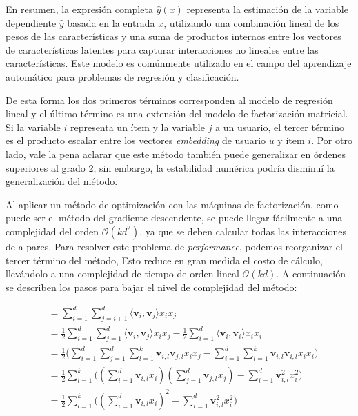 \documentclass[11pt,a4paper,twoside]{thesis}
\begin{document}
En resumen, la expresión completa $\hat{y}(x)$ representa la estimación de la
variable dependiente $\hat{y}$ basada en la entrada $x$, utilizando una
combinación lineal de los pesos de las características y una suma de productos
internos entre los vectores de características latentes para capturar
interacciones no lineales entre las características. Este modelo es comúnmente
utilizado en el campo del aprendizaje automático para problemas de regresión y
clasificación.

De esta forma los dos primeros términos corresponden al modelo de regresión
lineal y el último término es una extensión del modelo de factorización
matricial. Si la variable $i$ representa un ítem y la variable $j$ a un
usuario, el tercer término es el producto escalar entre los vectores
\textit{embedding} de usuario $u$ y ítem $i$. Por otro lado, vale la pena
aclarar que este método también puede generalizar en órdenes superiores al
grado 2, sin embargo, la estabilidad numérica podría disminuí la generalización
del método.

Al aplicar un método de optimización con las máquinas de factorización, como
puede ser el método del gradiente descendente, se puede llegar fácilmente a una
complejidad del orden $\mathcal{O}(kd^2)$, ya que se deben calcular todas las
interacciones de a pares. Para resolver este problema de \textit{performance},
podemos reorganizar el tercer término del método, Esto reduce en gran medida el
costo de cálculo, llevándolo a una complejidad de tiempo de orden lineal
$\mathcal{O}(kd)$. A continuación se describen los pasos para bajar el nivel de
complejidad del método:

\begin{equation}
	\begin{split}
		 & =\sum_{i=1}^d \sum_{j=i+1}^d \langle\mathbf{v}_i, \mathbf{v}_j\rangle x_i x_j                                                                                                       \\
		 & = \frac{1}{2} \sum_{i=1}^d \sum_{j=1}^d\langle\mathbf{v}_i, \mathbf{v}_j\rangle x_i x_j - \frac{1}{2}\sum_{i=1}^d \langle\mathbf{v}_i, \mathbf{v}_i\rangle x_i x_i                  \\
		 & = \frac{1}{2} \big (\sum_{i=1}^d \sum_{j=1}^d \sum_{l=1}^k\mathbf{v}_{i, l} \mathbf{v}_{j, l} x_i x_j - \sum_{i=1}^d \sum_{l=1}^k \mathbf{v}_{i, l} \mathbf{v}_{i, l} x_i x_i \big) \\
		 & =  \frac{1}{2} \sum_{l=1}^k \big ((\sum_{i=1}^d \mathbf{v}_{i, l} x_i) (\sum_{j=1}^d \mathbf{v}_{j, l}x_j) - \sum_{i=1}^d \mathbf{v}_{i, l}^2 x_i^2 \big )                          \\
		 & = \frac{1}{2} \sum_{l=1}^k \big ((\sum_{i=1}^d \mathbf{v}_{i, l} x_i)^2 - \sum_{i=1}^d \mathbf{v}_{i, l}^2 x_i^2)
	\end{split}
\end{equation}
\end{document}
